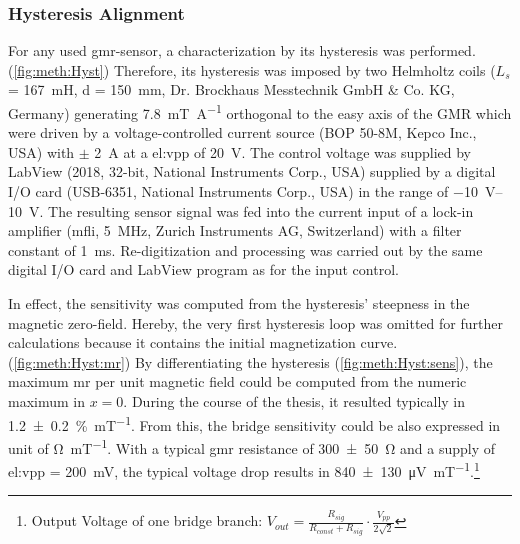 \subsubsection{Hysteresis Alignment}
For any used \gls{gmr}-sensor, a characterization by its hysteresis was performed.(\cref{fig:meth:Hyst})  Therefore, its hysteresis was imposed by two Helmholtz coils ($L_s$ = \SI{167}{\milli\henry}, d = \SI{150}{\milli\meter}, Dr. Brockhaus Messtechnik GmbH \& Co. KG, Germany) generating \SI{7.8}{\milli\tesla\per\ampere} orthogonal to the easy axis of the GMR which were driven by a voltage-controlled current source (BOP 50-8M, Kepco Inc., USA) with $\pm$ \SI{2}{\ampere} at a \gls{el:vpp} of \SI{20}{\volt}. The control voltage was supplied by LabView (2018, 32-bit, National Instruments Corp., USA) supplied by a digital I/O card (USB-6351, National Instruments Corp., USA) in the range of \SIrange{-10}{10}{\volt}.
The resulting sensor signal was fed into the current input of a lock-in amplifier (\gls{mfli}, \SI{5}{\mega\hertz}, Zurich Instruments AG, Switzerland) with a filter constant of \SI{1}{\milli\second}.
Re-digitization and processing was carried out by the same digital I/O card and LabView program as for the input control.

In effect, the sensitivity was computed from the hysteresis' steepness in the magnetic zero-field. Hereby, the very first hysteresis loop was omitted for further calculations because it contains the initial magnetization curve.(\cref{fig:meth:Hyst:mr}) By differentiating the hysteresis (\cref{fig:meth:Hyst:sens}), the maximum \gls{mr} per unit magnetic field could be computed from the numeric maximum in $x = 0$. During the course of the thesis, it resulted typically in \SI{1.2 +- 0.2}{\percent\per\milli\tesla}. From this, the bridge sensitivity could be also expressed in unit of \si{\ohm\per\milli\tesla}. With a typical \gls{gmr} resistance of \SI{300 +- 50}{\ohm} and a supply of \gls{el:vpp} = \SI{200}{\milli\volt}, the typical voltage drop results in \SI{840 +- 130}{\micro\volt\per\milli\tesla}.\footnote{Output Voltage of one bridge branch: $V_{out} = \frac{R_{sig}}{R_{const}+R_{sig}}\cdot \frac{V_{pp}}{2\sqrt{2}}$}

